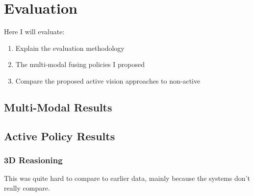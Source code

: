 \chapter{Evaluation}\label{ch:eval}
Here I will evaluate:
\begin{enumerate}
  \item Explain the evaluation methodology
  \item The multi-modal fusing policies I proposed
  \item Compare the proposed active vision approaches to non-active
\end{enumerate}





\section{Multi-Modal Results}

  

  
  
  

  

  
  
  

  


\section{Active Policy Results}
\subsection{3D Reasioning}
This was quite hard to compare to earlier data, mainly because the systems don't really compare. 

